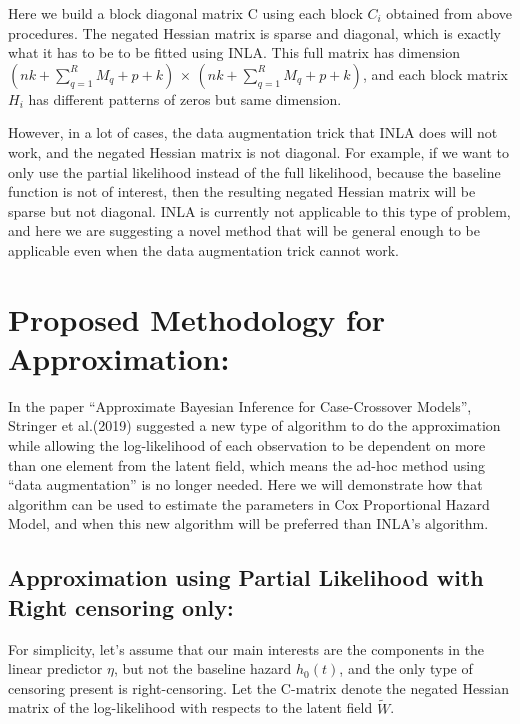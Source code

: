 \documentclass[]{article}
\begin{document}
Here we build a block diagonal matrix C using each block \(C_i\)
obtained from above procedures. The negated Hessian matrix is sparse and
diagonal, which is exactly what it has to be to be fitted using INLA.
This full matrix has dimension \((nk+\sum_{q=1}^{R}M_q + p +k)\)
\(\times\) \((nk+\sum_{q=1}^{R}M_q + p +k)\), and each block matrix
\(H_{i}\) has different patterns of zeros but same dimension.

However, in a lot of cases, the data augmentation trick that INLA does
will not work, and the negated Hessian matrix is not diagonal. For
example, if we want to only use the partial likelihood instead of the
full likelihood, because the baseline function is not of interest, then
the resulting negated Hessian matrix will be sparse but not diagonal.
INLA is currently not applicable to this type of problem, and here we
are suggesting a novel method that will be general enough to be
applicable even when the data augmentation trick cannot work.

\hypertarget{proposed-methodology-for-approximation}{%
\section{Proposed Methodology for
Approximation:}\label{proposed-methodology-for-approximation}}

In the paper ``Approximate Bayesian Inference for Case-Crossover
Models'', Stringer et al.(2019) suggested a new type of algorithm to do
the approximation while allowing the log-likelihood of each observation
to be dependent on more than one element from the latent field, which
means the ad-hoc method using ``data augmentation'' is no longer needed.
Here we will demonstrate how that algorithm can be used to estimate the
parameters in Cox Proportional Hazard Model, and when this new algorithm
will be preferred than INLA's algorithm.

\hypertarget{approximation-using-partial-likelihood-with-right-censoring-only}{%
\subsection{Approximation using Partial Likelihood with Right censoring
only:}\label{approximation-using-partial-likelihood-with-right-censoring-only}}

For simplicity, let's assume that our main interests are the components
in the linear predictor \(\eta\), but not the baseline hazard
\(h_0(t)\), and the only type of censoring present is right-censoring.
Let the C-matrix denote the negated Hessian matrix of the log-likelihood
with respects to the latent field \(\tilde{W}\).
\end{document}
